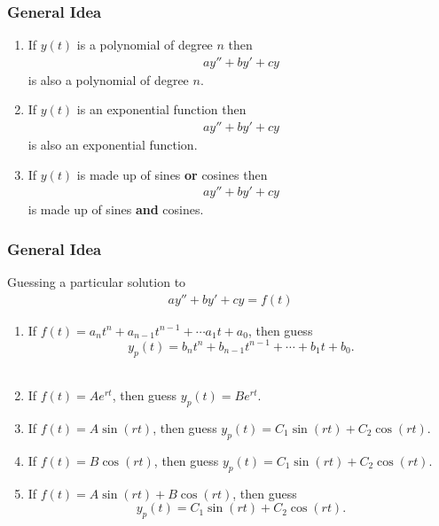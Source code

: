\begin{frame}
  \frametitle{General Idea}

  \begin{enumerate}
  \item If $y(t)$ is a polynomial of degree $n$ then
    \begin{eqnarray*}
      a y'' + b y' + cy
    \end{eqnarray*}
    is also a polynomial of degree $n$.
  \item If $y(t)$ is an exponential function then
    \begin{eqnarray*}
      a y'' + by' + cy
    \end{eqnarray*}
    is also an exponential function.
  \item If $y(t)$ is made up of sines \textbf{\color{red}or} cosines then
    \begin{eqnarray*}
      a y'' + by' + cy
    \end{eqnarray*}
    is  made up of sines \textbf{\color{red}and} cosines.
  \end{enumerate}

\end{frame}


\begin{frame}
  \frametitle{General Idea}
   Guessing a particular solution to
     \begin{eqnarray*}
      a y'' + b y' + cy  = f(t)
    \end{eqnarray*}

  \begin{enumerate}
  \item If {\color{blue}$f(t) = a_nt^n+a_{n-1}t^{n-1}+\cdots a_1t+ a_0$}, then
      guess {\color{red}$$y_p(t) = b_nt^n+b_{n-1}t^{n-1}+\cdots +b_1t+b_0.$$}\\

  \item If {\color{blue} $f(t)= A e^{rt}$}, then guess
       {\color{red} $y_p(t) = Be^{rt}$.}\\
  \vspace{.5cm}
  \item If {\color{blue}$f(t) = A\sin(rt)$}, then guess
      {\color{red}$y_p(t) = C_1\sin(rt) +C_2\cos(rt)$.}\\
  \vspace{.5cm}

  \item If {\color{blue} $f(t) = B\cos(rt)$}, then guess
      {\color{red}$y_p(t) = C_1\sin(rt) +C_2\cos(rt)$.}\\
  \vspace{.5cm}

  \item If {\color{blue}$f(t) = A\sin(rt)+B\cos(rt)$}, then guess
     {\color{red} $$y_p(t) = C_1\sin(rt) +C_2\cos(rt).$$}
  \end{enumerate}

\end{frame}


